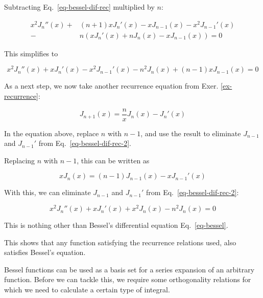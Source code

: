 Subtracting Eq.~\ref{eq-bessel-dif-rec} multiplied by $n$:

\begin{align}
x^2 J_n''(x) +& (n + 1) x J_n'(x) - x J_{n-1}(x) - x^2 J_{n-1}'(x) \nonumber \\-& n\left(x J_n'(x) + n J_n(x) - x J_{n-1}(x)\right)= 0
\end{align} 

This simplifies to

\begin{equation}
x^2 J_n''(x) +  x J_n'(x) - x^2 J_{n-1}'(x) - n^2 J_n(x) + (n - 1) x J_{n-1}(x)= 0 \label{eq-bessel-dif-rec-2}
\end{equation} 

As a next step, we now take another recurrence equation from Exer. \ref{ex-recurrence}:

\begin{equation}
J_{n+1}(x) = \frac{n}{x}J_n(x) - J_n'(x)
\end{equation} 

\begin{cue}
In the equation above, replace $n$ with $n-1$, and use the result to eliminate $J_{n-1}$ and $J_{n-1}'$ from Eq.~\ref{eq-bessel-dif-rec-2}.
\end{cue}

Replacing $n$ with $n-1$, this can be written as

\begin{equation}
x J_{n}(x) = (n-1)J_{n-1}(x) - x J_{n-1}'(x)
\end{equation} 

With this, we can eliminate $J_{n-1}$ and $J_{n-1}'$ from Eq.~\ref{eq-bessel-dif-rec-2}:

\begin{equation}
x^2 J_n''(x) +  x J_n'(x) + x^2 J_n(x) - n^2 J_n(x) = 0
\end{equation} 

This is nothing other than Bessel's differential equation Eq.~\ref{eq-bessel}.

This shows that any function satisfying the recurrence relations used, also satisfies Bessel's equation.


\pagebreak



Bessel functions can be used as a basis set for a series expansion of an arbitrary function. Before we can tackle this, we require some orthogonality relations for which we need to calculate a certain type of integral.

